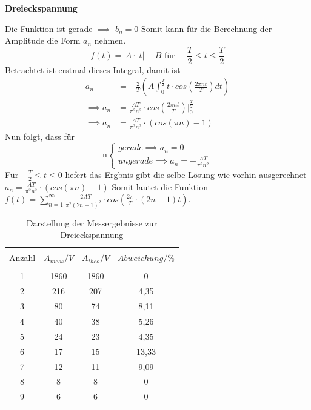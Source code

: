\centerline{\textbf{Dreieckspannung}}
Die Funktion ist gerade $\implies$ $b_n = 0$
Somit kann für die Berechnung der Amplitude die Form $a_n$ nehmen.
\begin{equation*}
  f(t)= \, A\cdot |t| - B \,\, \text{für} \, -\frac{T}{2} \leq t \leq \frac{T}{2}
\end{equation*}
Betrachtet ist erstmal dieses Integral, damit ist
\begin{align*}
  a_n &= -\frac{2}{T} (A \int_{0}^\frac{T}{2} t \cdot cos(\frac{2\pi nt}{T})dt)\\
  \implies a_n &= \frac{AT}{\pi^2 n^2} \cdot cos(\frac{2\pi nt}{T})\biggl|_{0}^\frac{T}{2}\\
  \implies a_n &= \frac{AT}{\pi^2 n^2} \cdot (cos(\pi n)-1)
\end{align*}
Nun folgt, dass für
\begin{equation*}
  \text{n}
  \begin{cases}
    gerade \implies a_n = 0 \,\, \\
    ungerade \implies a_n = -\frac{AT}{\pi^2 n^2}
  \end{cases}
\end{equation*}
Für $-\frac{T}{2} \leq t \leq 0$ liefert
das Ergbnis gibt die selbe Lösung wie vorhin ausgerechnet $a_n = \frac{AT}{\pi^2 n^2} \cdot (cos(\pi n)-1)$
Somit lautet die Funktion $f(t) = \sum^{\infty}_{n=1} \frac{-2AT}{\pi^2 (2n-1)^2} \cdot cos(\frac{2\pi}{T}\cdot(2n-1)t)$.
\begin{table}[H]
  \centering
  \begin{tabular}{c c c c}
    \toprule\\
    Anzahl & $A_{mess} / V$ & $A_{theo} / V$ & $Abweichung / \% $\\
    \midrule \\
    1 & 1860 & 1860 & 0  \\
    2 & 216 & 207 & 4,35 \\
    3 & 80  & 74 & 8,11  \\
    4 & 40  & 38 & 5,26  \\
    5 & 24  & 23 & 4,35  \\
    6 & 17  & 15 & 13,33 \\
    7 & 12  & 11 & 9,09  \\
    8 & 8   & 8  & 0 \\
    9 & 6   & 6  & 0 \\
    \bottomrule
  \end{tabular}
  \caption{Darstellung der Messergebnisse zur Dreieckspannung}
  \label{tab:2}
\end{table}
